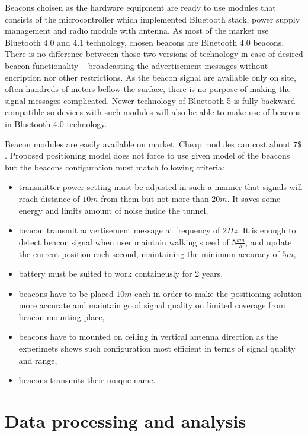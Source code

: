\documentclass[../main.tex]{subfiles}
\begin{document}
Beacons choisen as the hardware equipment are ready to use modules that consists of the microcontroller which implemented Bluetooth stack, power supply management and radio module with antenna. As most of the market use Bluetooth 4.0 and 4.1 technology, chosen beacons are Bluetooth 4.0 beacons. There is no difference betweeen those two versions of technology in case of desired beacon functionality -- broadcasting the advertisement messages without encription nor other restrictions. As the beacon signal are available only on site, often hundreds of meters bellow the surface, there is no purpose of making the signal messages complicated. Newer technology of Bluetooth 5 is fully backward compatible so devices with such modules will also be able to make use of beacons in Bluetooth 4.0 technology.

Beacon modules are easily available on market. Cheap modules can cost about $7\$$. Proposed positioning model does not force to use given model of the beacons but the beacons configuration must match following criteria:
\begin{itemize}
	\item transmitter power setting must be adjusted in such a manner that signals will reach distance of $10m$ from them but not more than $20m$. It saves some energy and limits amount of noise inside the tunnel,
	\item beacon transmit advertisement message at frequency of $2Hz$. It is enough to detect beacon signal when user maintain walking speed of $5\frac{km}{h}$, and update the current position each second, maintaining the minimum accuracy of $5m$,
	\item battery must be suited to work containeusly for 2 years,
	\item beacons have to be placed $10m$ each in order to make the positioning solution more accurate and maintain good signal quality on limited coverage from beacon mounting place,
	\item beacons have to mounted on ceiling in vertical antenna direction as the experimets shows such configuration most efficient in terms of signal quality and range,
	\item beacons transmits their unique name.
\end{itemize}


\section{Data processing and analysis} %
\label{sec:data_processing}
\end{document}
